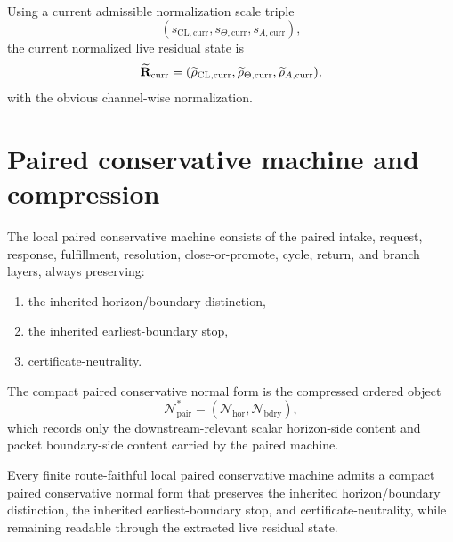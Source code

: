 \begin{definition}\label{def:current-normalized-state}
Using a current admissible normalization scale triple
\[
(s_{\mathrm{CL,curr}},s_{\Theta,\mathrm{curr}},s_{A,\mathrm{curr}}),
\]
the current normalized live residual state is
\[
\widetilde{\mathbf{R}}_{\mathrm{curr}}=(\widetilde{\rho}_{\mathrm{CL,curr}},\widetilde{\rho}_{\Theta,\mathrm{curr}},\widetilde{\rho}_{A,\mathrm{curr}}),
\]
with the obvious channel-wise normalization.
\end{definition}

\section{Paired conservative machine and compression}
\begin{definition}\label{def:paired-machine}
The local paired conservative machine consists of the paired intake, request, response, fulfillment, resolution, close-or-promote, cycle, return, and branch layers, always preserving:
\begin{enumerate}[leftmargin=2em]
  \item the inherited horizon/boundary distinction,
  \item the inherited earliest-boundary stop,
  \item certificate-neutrality.
\end{enumerate}
\end{definition}

\begin{definition}\label{def:compact-normal-form}
The compact paired conservative normal form is the compressed ordered object
\[
\mathcal{N}^{\ast}_{\mathrm{pair}}=(\mathcal{N}_{\mathrm{hor}},\mathcal{N}_{\mathrm{bdry}}),
\]
which records only the downstream-relevant scalar horizon-side content and packet boundary-side content carried by the paired machine.
\end{definition}

\begin{theorem}\label{thm:compression-invariant-control}
Every finite route-faithful local paired conservative machine admits a compact paired conservative normal form that preserves the inherited horizon/boundary distinction, the inherited earliest-boundary stop, and certificate-neutrality, while remaining readable through the extracted live residual state.
\end{theorem}


